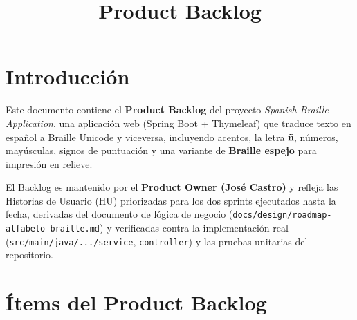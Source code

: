 \documentclass[11pt]{article}
\title{Product Backlog}
\author{}
\date{}
\begin{document}

\section{Introducción}
Este documento contiene el \textbf{Product Backlog} del proyecto \textit{Spanish Braille Application},
una aplicación web (Spring Boot + Thymeleaf) que traduce texto en español a Braille Unicode y viceversa,
incluyendo acentos, la letra \textbf{ñ}, números, mayúsculas, signos de puntuación y una variante de
\textbf{Braille espejo} para impresión en relieve.

El Backlog es mantenido por el \textbf{Product Owner (José Castro)} y refleja las Historias de Usuario (HU)
priorizadas para los dos sprints ejecutados hasta la fecha, derivadas del documento de lógica de negocio
(\texttt{docs/design/roadmap-alfabeto-braille.md}) y verificadas contra la implementación real
(\texttt{src/main/java/.../service}, \texttt{controller}) y las pruebas unitarias del repositorio.

\section{Ítems del Product Backlog}
\end{document}
